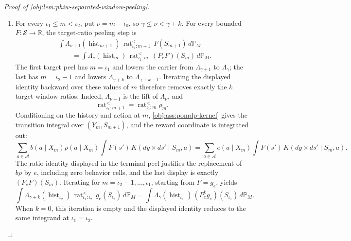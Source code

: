 \documentclass[11pt]{article}
\begin{document}
\begin{proof}[Proof of \cref{obj:lem:phiw-separated-window-peeling}]
\begin{enumerate}
\item For every \(\iota_1\le m<\iota_2\), put \(\nu=m-\iota_0\), so
\(\gamma\le\nu<\gamma+k\).  For every bounded \(F:\mathcal S\to\mathbb R\), the target-ratio
peeling step is
\[
\begin{aligned}
&\int
\Lambda_{\nu+1}(\operatorname{hist}_{m+1})\,
\operatorname{rat}^{<}_{\iota_1:m+1}\,
F(S_{m+1})\,d\mathbb P_M \\
&\qquad =
\int
\Lambda_{\nu}(\operatorname{hist}_{m})\,
\operatorname{rat}^{<}_{\iota_1:m}\,
(P_eF)(S_m)\,d\mathbb P_M .
\end{aligned}
\]
The first target peel has \(m=\iota_1\) and lowers the carrier from \(\Lambda_{\gamma+1}\) to
\(\Lambda_\gamma\); the last has \(m=\iota_2-1\) and lowers \(\Lambda_{\gamma+k}\) to
\(\Lambda_{\gamma+k-1}\). Iterating the displayed identity backward over these values of \(m\)
therefore removes exactly the \(k\) target-window ratios. Indeed, \(\Lambda_{\nu+1}\) is the lift of
\(\Lambda_\nu\), and
\[
\operatorname{rat}^{<}_{\iota_1:m+1}
=
\operatorname{rat}^{<}_{\iota_1:m}\rho_m.
\]
Conditioning on the history and action at \(m\), \cref{obj:ass:pomdp-kernel} gives the transition integral over \((Y_m,S_{m+1})\), and the reward coordinate is integrated out:
\[
\sum_{a\in\mathcal A}
 b(a\mid X_m)\rho(a\mid X_m)
 \int F(s')\,K(dy\times ds'\mid S_m,a)
=
\sum_{a\in\mathcal A}
 e(a\mid X_m)
 \int F(s')\,K(dy\times ds'\mid S_m,a).
\]
The ratio identity displayed in the terminal peel justifies the replacement of \(b\rho\) by \(e\), including zero behavior cells, and the last display is exactly \((P_eF)(S_m)\).  Iterating for \(m=\iota_2-1,\ldots,\iota_1\), starting from \(F=g_e\), yields
\[
\int
\Lambda_{\gamma+k}(\operatorname{hist}_{\iota_2})\,
\operatorname{rat}^{<}_{\iota_1:\iota_2}\,
g_e(S_{\iota_2})\,d\mathbb P_M
=
\int
\Lambda_{\gamma}(\operatorname{hist}_{\iota_1})\,
(P_e^kg_e)(S_{\iota_1})\,d\mathbb P_M .
\]
When \(k=0\), this iteration is empty and the displayed identity reduces to the same integrand at \(\iota_1=\iota_2\).


\end{enumerate}
\end{proof}
\end{document}

